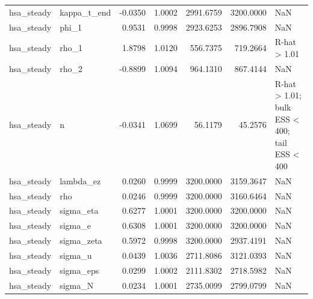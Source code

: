 \begin{tabular}{llrrrrl}
hsa\_steady & kappa\_t\_end & -0.0350 & 1.0002 & 2991.6759 & 3200.0000 & NaN \\
hsa\_steady & phi\_1 & 0.9531 & 0.9998 & 2923.6253 & 2896.7908 & NaN \\
hsa\_steady & rho\_1 & 1.8798 & 1.0120 & 556.7375 & 719.2664 & R-hat > 1.01 \\
hsa\_steady & rho\_2 & -0.8899 & 1.0094 & 964.1310 & 867.4144 & NaN \\
hsa\_steady & n & -0.0341 & 1.0699 & 56.1179 & 45.2576 & R-hat > 1.01; bulk ESS < 400; tail ESS < 400 \\
hsa\_steady & lambda\_ez & 0.0260 & 0.9999 & 3200.0000 & 3159.3647 & NaN \\
hsa\_steady & rho & 0.0246 & 0.9999 & 3200.0000 & 3160.6464 & NaN \\
hsa\_steady & sigma\_eta & 0.6277 & 1.0001 & 3200.0000 & 3200.0000 & NaN \\
hsa\_steady & sigma\_e & 0.6308 & 1.0001 & 3200.0000 & 3200.0000 & NaN \\
hsa\_steady & sigma\_zeta & 0.5972 & 0.9998 & 3200.0000 & 2937.4191 & NaN \\
hsa\_steady & sigma\_u & 0.0439 & 1.0036 & 2711.8086 & 3121.0393 & NaN \\
hsa\_steady & sigma\_eps & 0.0299 & 1.0002 & 2111.8302 & 2718.5982 & NaN \\
hsa\_steady & sigma\_N & 0.0234 & 1.0001 & 2735.0099 & 2799.0799 & NaN \\
\bottomrule
\end{tabular}
